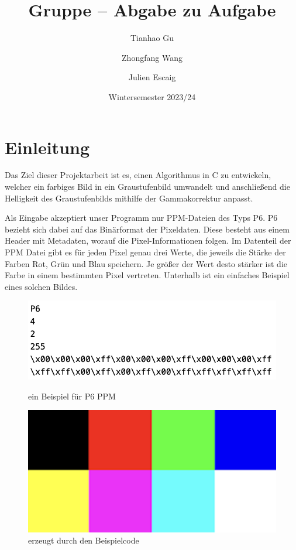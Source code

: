 \documentclass[course=erap]{aspdoc}
\author{Tianhao Gu \and Zhongfang Wang \and Julien Escaig}
\date{Wintersemester 2023/24} %
\title{Gruppe \theGroup{} -- Abgabe zu Aufgabe \theNumber}
\begin{document}
\maketitle

\section{Einleitung}


\par
Das Ziel dieser Projektarbeit ist es, einen Algorithmus in C zu entwickeln, welcher ein farbiges Bild in ein Graustufenbild umwandelt und anschließend die Helligkeit des Graustufenbilds mithilfe der Gammakorrektur anpasst.

\par
Als Eingabe akzeptiert unser Programm nur PPM-Dateien \cite{netpbm} des Typs P6. P6 bezieht sich dabei auf das Binärformat der Pixeldaten.  Diese besteht aus einem Header mit Metadaten, worauf die Pixel-Informationen folgen. Im Datenteil der PPM Datei gibt es für jeden Pixel genau drei Werte, die jeweils die Stärke der Farben Rot, Grün und Blau speichern. Je größer der Wert desto stärker ist die Farbe in einem bestimmten Pixel vertreten. Unterhalb ist ein einfaches Beispiel eines solchen Bildes.

\begin{figure}[h]
\begin{minipage}{0.45\textwidth}
\centering
\includegraphics[width=\textwidth]{Bilder/demograph.png}
\caption{ein Beispiel für P6 PPM}
\end{minipage}
\hfill
\begin{minipage}{0.45\textwidth}
\centering
\includegraphics[width=\textwidth]{Bilder/demograph.ppm.png}
\caption{erzeugt durch den Beispielcode}
\end{minipage}
\end{figure}
\end{document}
